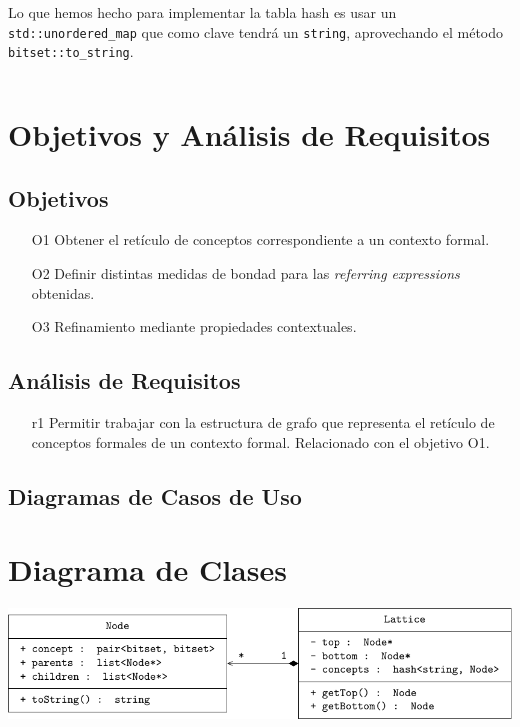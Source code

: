 \documentclass[
hue = 206,
sdrawing = 0.44,
bdrawing = 0.73,
stext = 0.45,
btext = 0.44,
sline = 0.46,
bline = 0.15]{grigerart}
\begin{document}
Lo que hemos hecho para implementar la tabla hash es usar un \texttt{std::unordered\_map} que como clave tendrá un \texttt{string}, aprovechando el método \texttt{bitset::to\_string}.
\begin{lstlisting}

\end{lstlisting}

\appendix

\section{Objetivos y Análisis de Requisitos}
\label{sec:objetivos-requisitos}

\subsection{Objetivos}

\begin{itemize}
  \item[O1] Obtener el retículo de conceptos correspondiente a un contexto formal.
  \item[O2] Definir distintas medidas de bondad para las \textit{referring expressions} obtenidas.
  \item[O3] Refinamiento mediante propiedades contextuales.
\end{itemize}

\subsection{Análisis de Requisitos}
\label{sec:requisitos}

\begin{itemize}
  \item[r1] Permitir trabajar con la estructura de grafo que representa el retículo de conceptos formales de un contexto formal. Relacionado con el objetivo O1.
\end{itemize}

\subsection{Diagramas de Casos de Uso}
\label{sec:casos-uso}

\section{Diagrama de Clases}
\label{sec:clases}

\begin{center}
  \includegraphics{figures/diagram.pdf}
\end{center}
\end{document}

